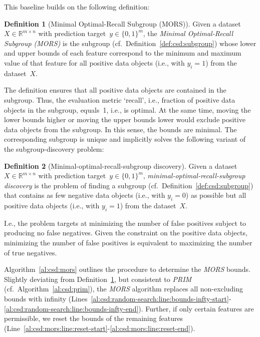 \documentclass{article}
\theoremstyle{definition}
\newtheorem{definition}{Definition}
\begin{document}
This baseline builds on the following definition:
%
\begin{definition}[Minimal Optimal-Recall Subgroup (MORS)]
	Given a dataset~$X \in \mathbb{R}^{m \times n}$ with prediction target~$y \in \{0, 1\}^m$,
	the \emph{Minimal Optimal-Recall Subgroup (MORS)} is the subgroup (cf.~Definition~\ref{def:csd:subgroup}) whose lower and upper bounds of each feature correspond to the minimum and maximum value of that feature for all positive data objects (i.e., with $y_i = 1$) from the dataset~$X$.
	\label{def:csd:mors}
\end{definition}
%
The definition ensures that all positive data objects are contained in the subgroup.
Thus, the evaluation metric `recall', i.e., fraction of positive data objects in the subgroup, equals~1, i.e., is optimal.
At the same time, moving the lower bounds higher or moving the upper bounds lower would exclude positive data objects from the subgroup.
In this sense, the bounds are minimal.
The corresponding subgroup is unique and implicitly solves the following variant of the subgroup-discovery problem:
%
\begin{definition}[Minimal-optimal-recall-subgroup discovery]
	Given a dataset $X \in \mathbb{R}^{m \times n}$ with prediction target~$y \in \{0, 1\}^m$,
	\emph{minimal-optimal-recall-subgroup discovery} is the problem of finding a subgroup (cf.~Definition~\ref{def:csd:subgroup}) that contains as few negative data objects (i.e., with $y_i = 0$) as possible but all positive data objects (i.e., with $y_i = 1$) from the dataset~$X$.
	\label{def:csd:minimal-optimal-recall-subgroup-discovery}
\end{definition}
%
I.e., the problem targets at minimizing the number of false positives subject to producing no false negatives.
Given the constraint on the positive data objects, minimizing the number of false positives is equivalent to maximizing the number of true negatives.

Algorithm~\ref{al:csd:mors} outlines the procedure to determine the \emph{MORS} bounds.
Slightly deviating from Definition~\ref{def:csd:mors}, but consistent to \emph{PRIM} (cf.~Algorithm~\ref{al:csd:prim}), the \emph{MORS} algorithm replaces all non-excluding bounds with infinity (Lines~\ref{al:csd:random-search:line:bounds-infty-start}-\ref{al:csd:random-search:line:bounds-infty-end}).
Further, if only certain features are permissible, we reset the bounds of the remaining features (Line~\ref{al:csd:mors:line:reset-start}-\ref{al:csd:mors:line:reset-end}).
\end{document}
